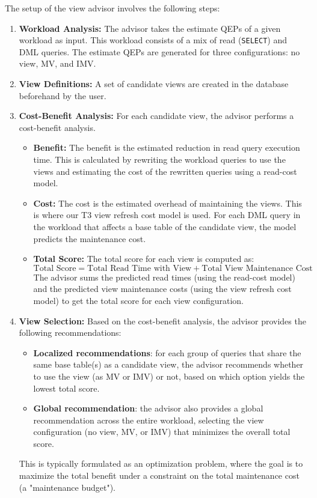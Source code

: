 The setup of the view advisor involves the following steps:
\begin{enumerate}
    \item \textbf{Workload Analysis:} The advisor takes the estimate \ac{QEP}s of a given workload as input. This workload consists of a mix of read (\texttt{SELECT}) and \ac{DML} queries. The estimate \ac{QEP}s are generated for three configurations: no view, \ac{MV}, and \ac{IMV}.
    \item \textbf{View Definitions:} A set of candidate views are created in the database beforehand by the user.
    \item \textbf{Cost-Benefit Analysis:} For each candidate view, the advisor performs a cost-benefit analysis.
    \begin{itemize}
        \item \textbf{Benefit:} The benefit is the estimated reduction in read query execution time. This is calculated by rewriting the workload queries to use the views and estimating the cost of the rewritten queries using a read-cost model.
        \item \textbf{Cost:} The cost is the estimated overhead of maintaining the views. This is where our T3 view refresh cost model is used. For each \ac{DML} query in the workload that affects a base table of the candidate view, the model predicts the maintenance cost.
        \item \textbf{Total Score:} The total score for each view is computed as:
        \[
        \text{Total Score} = \text{Total Read Time with View} + \text{Total View Maintenance Cost}
        \]
        The advisor sums the predicted read times (using the read-cost model) and the predicted view maintenance costs (using the view refresh cost model) to get the total score for each view configuration.

    \end{itemize}
    \item \textbf{View Selection:} Based on the cost-benefit analysis, the advisor provides the following recommendations:
    \begin{itemize}
        \item \textbf{Localized recommendations}: for each group of queries that share the same base table(s) as a candidate view, the advisor recommends whether to use the view (as \ac{MV} or \ac{IMV}) or not, based on which option yields the lowest total score.
        \item \textbf{Global recommendation}: the advisor also provides a global recommendation across the entire workload, selecting the view configuration (no view, \ac{MV}, or \ac{IMV}) that minimizes the overall total score. 
    \end{itemize}
    This is typically formulated as an optimization problem, where the goal is to maximize the total benefit under a constraint on the total maintenance cost (a "maintenance budget").
\end{enumerate}

